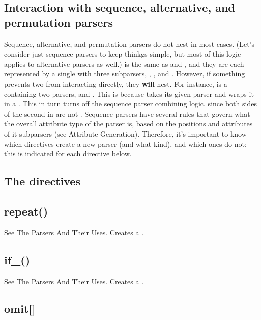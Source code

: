 \documentclass{MyBook}
\begin{document}
\subsection{Interaction with sequence, alternative, and permutation parsers}

Sequence, alternative, and permutation parsers do not nest in most cases. (Let's consider just sequence parsers to keep thinkgs simple, but most of this logic applies to alternative parsers as well.)  is the same as  and , and they are each represented by a single  with three subparsers, , , and . However, if something prevents two  from interacting directly, they \textbf{will} nest. For instance,  is a  containing two parsers,  and . This is because  takes its given parser and wraps it in a . This in turn turns off the sequence parser combining logic, since both sides of the second  in  are not . Sequence parsers have several rules that govern what the overall attribute type of the parser is, based on the positions and attributes of it subparsers (see Attribute Generation). Therefore, it's important to know which directives create a new parser (and what kind), and which ones do not; this is indicated for each directive below.

\subsection{The directives}

\subsection{repeat()}

See The Parsers And Their Uses. Creates a .

\subsection{if\_()}

See The Parsers And Their Uses. Creates a .

\subsection{omit{[}{]}}
\end{document}
